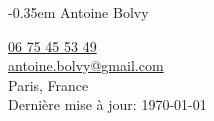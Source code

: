 \documentclass[
  french,
  a4paper
]{resume-openfont}
\begin{document}
\noindent%
\begin{minipage}{.5\textwidth}
\kern-0.35em
{
  \fontsize{28pt}{28pt}
  \selectfont Antoine Bolvy\\
}
\vspace{5pt}


\end{minipage}%
\begin{minipage}{.5\textwidth}
\begin{flushright}
\color{headings}\href{tel:+33675455349}{06 75 45 53 49}\\
\href{mailto:antoine.bolvy@gmail.com}{antoine.bolvy@gmail.com}\\
Paris, France\\
{\color{date}\fontsize{7pt}{12pt}\selectfont{}Dernière mise à jour: \today}
\end{flushright}
\end{minipage}

\noindent\makebox[\linewidth]{
{\color{headingsrulegray}\rule{\paperwidth}{0.4pt}}}
\vspace{-18pt}

%
%
\end{document}
